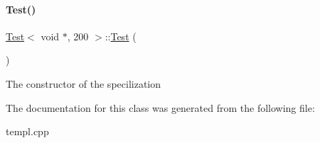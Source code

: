 \paragraph{\texorpdfstring{Test()}{Test()}}
{\footnotesize\ttfamily \mbox{\hyperlink{class_test}{Test}}$<$ void $\ast$, 200 $>$\+::\mbox{\hyperlink{class_test}{Test}} (\begin{DoxyParamCaption}{ }\end{DoxyParamCaption})}

The constructor of the specilization 

The documentation for this class was generated from the following file\+:\begin{DoxyCompactItemize}
\item 
templ.\+cpp\end{DoxyCompactItemize}
